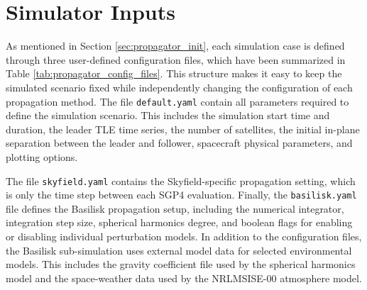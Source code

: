 \section{Simulator Inputs}
As mentioned in Section \ref{sec:propagator_init}, each simulation case is defined through three user-defined configuration files, which have been summarized in Table \ref{tab:propagator_config_files}. This structure makes it easy to keep the simulated scenario fixed while independently changing the configuration of each propagation method. The file \texttt{default.yaml} contain all parameters required to define the simulation scenario. This includes the simulation start time and duration, the leader TLE time series, the number of satellites, the initial in-plane separation between the leader and follower, spacecraft physical parameters, and plotting options.

The file \texttt{skyfield.yaml} contains the Skyfield-specific propagation setting, which is only the time step between each SGP4 evaluation. Finally, the \texttt{basilisk.yaml} file defines the Basilisk propagation setup, including the numerical integrator, integration step size, spherical harmonics degree, and boolean flags for enabling or disabling individual perturbation models. In addition to the configuration files, the Basilisk sub-simulation uses external model data for selected environmental models. This includes the gravity coefficient file used by the spherical harmonics model and the space-weather data used by the NRLMSISE-00 atmosphere model.

